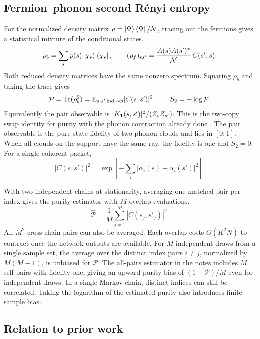 \documentclass[../../main.tex]{subfiles}
\begin{document}
\subsection{Fermion--phonon second R\'enyi entropy}
\label{sec:renyi}

For the normalized density matrix
\(\rho=\left\lvert \Psi \right\rangle\left\langle \Psi \right\rvert/\mathcal N\), tracing out the fermions gives
a statistical mixture of the conditional states.
\begin{equation}
 \rho_b=\sum_s p(s)\left\lvert \chi_s \right\rangle\left\langle \chi_s \right\rvert,\qquad
 (\rho_f)_{ss'}=
       \frac{A(s)A(s')^*}{\mathcal N}\,C(s',s).
 \label{eq:reduced}
\end{equation}
Both reduced density matrices have the same nonzero spectrum.
Squaring \(\rho_b\) and taking the trace gives
\begin{equation}
 \mathcal P=\operatorname{Tr}(\rho_b^2)=
 \mathbb{E}_{s,s'\,\mathrm{ind.}\sim p}|C(s,s')|^2,\qquad
 S_2=-\log\mathcal P.
 \label{eq:purity}
\end{equation}
Equivalently the pair observable is
\(\lvert K_{\mathbf{1}}(s,s')\rvert^2/(Z_s Z_{s'})\).
This is the two-copy swap identity for purity with the phonon
contraction already done \cite{hastings2010}.
The pair observable is the pure-state fidelity of two phonon clouds
and lies in \([0,1]\). When all clouds on the support have the same
ray, the fidelity is one and \(S_2=0\). For a single coherent packet,
\[
 |C(s,s')|^2=\exp\!\left[-\sum_i|\alpha_i(s)-\alpha_i(s')|^2\right].
\]

With two independent chains at stationarity, averaging one matched
pair per index gives the purity estimator with \(M\) overlap evaluations.
\begin{equation}
 \widehat{\mathcal P}
   =\frac1M\sum_{j=1}^{M}|C(s_j,s'_j)|^2 .
 \label{eq:purity-mc}
\end{equation}
All \(M^2\) cross-chain pairs can also be averaged. Each overlap costs
\(O(K^2N)\) to contract once the network outputs are available.
For \(M\) independent draws from a single sample set, the average over
the distinct index pairs \(i\ne j\), normalized by \(M(M-1)\), is
unbiased for \(\mathcal P\).
The all-pairs estimator in the notes includes \(M\) self-pairs with
fidelity one, giving an upward purity bias of
\((1-\mathcal P)/M\) even for independent draws.
In a single Markov chain, distinct indices can still be correlated.
Taking the logarithm of the estimated purity also introduces
finite-sample bias.

\subsection{Relation to prior work}
\label{sec:references}
\end{document}
